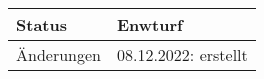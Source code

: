 \begin{table}[H]
\begin{tabularx}{\textwidth}{| l | X |}
        \hline
        Status          & Enwturf                                                                                                                                                                                                                                                                                                                                \\
        \hline
        Änderungen      & 08.12.2022: erstellt                                                                                                                                                                                                                                                                                                                   \\
        \hline
    \end{tabularx}
\end{table}


